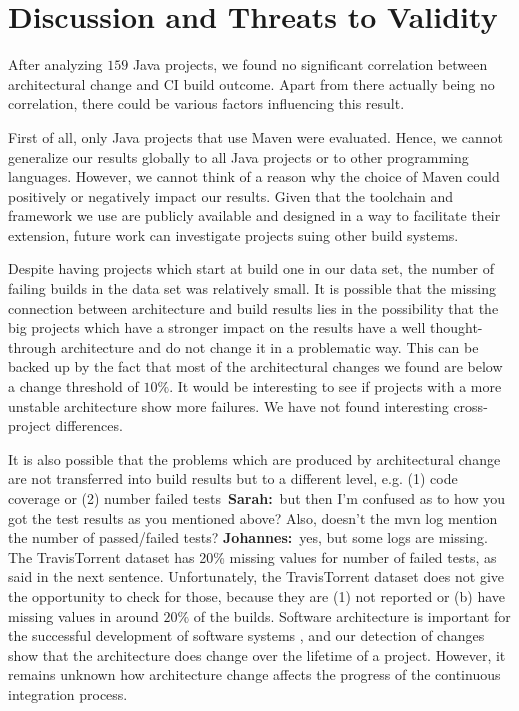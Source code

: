 \documentclass[sigplan, anonymous, review]{acmart}
\newcommand{\sn}[1]{{\color{blue}\textbf{Sarah:}~#1}}
\newcommand{\jk}[1]{{\color{violet}\textbf{Johannes:}~#1}}
\begin{document}
\section{Discussion and Threats to Validity}

After analyzing $159$ Java projects, we found no significant correlation between architectural change and CI build outcome. Apart from there actually being no correlation, there could be various factors influencing this result. 

First of all, only Java projects that use Maven were evaluated. Hence, we cannot generalize our results globally to all Java projects or to other programming languages. However, we cannot think of a reason why the choice of Maven could positively or negatively impact our results. Given that the toolchain and framework we use are publicly available and designed in a way to facilitate their extension, future work can investigate projects suing other build systems.

Despite having projects which start at build one in our data set, the number of failing builds in the data set was relatively small. 
It is possible that the missing connection between architecture and build results lies in the possibility that the big projects which have a stronger impact on the results have a well thought-through architecture and do not change it in a problematic way.
This can be backed up by the fact that most of the architectural changes we found are below a change threshold of $10\%$. It would be interesting to see if projects with a more unstable architecture show more failures. We have not found interesting cross-project differences.

It is also possible that the problems which are produced by architectural change are not transferred into build results but to a different level, e.g. (1) code coverage or (2) number failed tests~\sn{but then I'm confused as to how you got the test results as you mentioned above? Also, doesn't the mvn log mention the number of passed/failed tests?} \jk{yes, but some logs are missing. The TravisTorrent dataset has 20\% missing values for number of failed tests, as said in the next sentence}. Unfortunately, the TravisTorrent dataset does not give the opportunity to check for those, because they are (1) not reported or (b) have missing values in around $20\%$ of the builds. Software architecture is important for the successful development of software systems \cite{ADLs1}, and our detection of changes show that the architecture does change over the lifetime of a project. However, it remains unknown how architecture change affects the progress of the continuous integration process.
\end{document}
